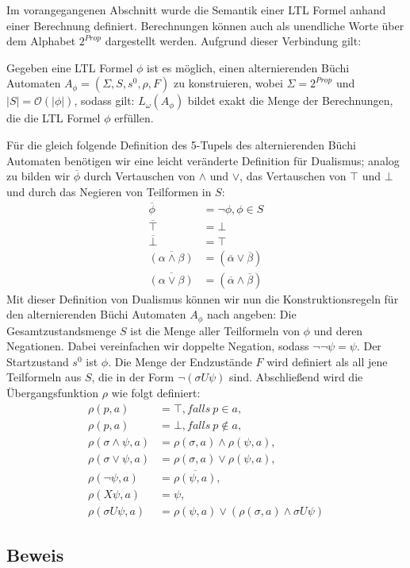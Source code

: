 Im vorangegangenen Abschnitt wurde die Semantik einer LTL Formel anhand einer Berechnung definiert. Berechnungen können auch als unendliche Worte über dem Alphabet $2^{Prop}$ dargestellt werden\cite{vardi+96}. Aufgrund dieser Verbindung gilt:
\begin{satz}\cite{vardi+96}
    Gegeben eine LTL Formel $\phi$ ist es möglich, einen alternierenden Büchi Automaten $A_\phi = (\Sigma, S, s^0, \rho, F)$ zu konstruieren, wobei $\Sigma = 2^{Prop}$ und $|S| = \mathcal{O}(|\phi|)$, sodass gilt: $L_\omega(A_\phi)$ bildet exakt die Menge der Berechnungen, die die LTL Formel $\phi$ erfüllen.
\end{satz}
Für die gleich folgende Definition des 5-Tupels des alternierenden Büchi Automaten benötigen wir eine leicht veränderte Definition für Dualismus; analog zu \cite{vardi+96} bilden wir $\overline{\phi}$ durch Vertauschen von $\land$ und $\lor$, das Vertauschen von $\top$ und $\bot$ und durch das Negieren von Teilformen in $S$:
\begin{equation}
\label{aba-zu-ltl:dualismus}
\begin{split}
    \overline{\phi} &= \lnot\phi, \phi \in S\\
    \overline{\top} &= \bot\\
    \overline{\bot} &= \top\\
    \overline{(\alpha \land \beta)} &= (\overline{\alpha} \lor \overline{\beta})\\
    \overline{(\alpha \lor \beta)} &= (\overline{\alpha} \land \overline{\beta})
\end{split}
\end{equation}
Mit dieser Definition von Dualismus können wir nun die Konstruktionsregeln für den alternierenden Büchi Automaten $A_\phi$ nach \cite{vardi+96} angeben: Die Gesamtzustandsmenge $S$ ist die Menge aller Teilformeln von $\phi$ und deren Negationen. Dabei vereinfachen wir doppelte Negation, sodass $\lnot\lnot\psi = \psi$. Der Startzustand $s^0$ ist $\phi$. 
Die Menge der Endzustände $F$ wird definiert als all jene Teilformeln aus $S$, die in der Form $\lnot(\sigma U\psi)$ sind. Abschließend wird die Übergangsfunktion $\rho$ wie folgt definiert:
\begin{equation}
\label{aba-zu-ltl:transitionsfunktion}
\begin{split}
    \rho(p, a) &= \top, falls \ p \in a,\\
    \rho(p, a) &= \bot, falls \ p \not\in a,\\
    \rho(\sigma \land \psi, a) &= \rho(\sigma, a) \land \rho(\psi, a),\\
    \rho(\sigma \lor \psi, a) &= \rho(\sigma, a) \lor \rho(\psi, a),\\
    \rho(\lnot\psi, a) &= \overline{\rho(\psi, a)},\\
    \rho(X\psi, a) &= \psi,\\
    \rho(\sigma U\psi, a) &= \rho(\psi, a) \lor (\rho(\sigma, a) \land \sigma U\psi)
\end{split}
\end{equation}


\subsection{Beweis}